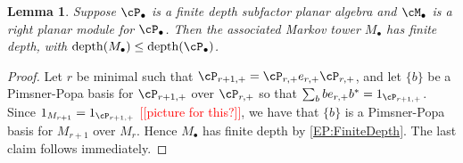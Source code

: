 \documentclass[11pt]{article}
\theoremstyle{plain}
\newtheorem{lem}[thm]{Lemma}
\theoremstyle{definition}
\newcommand{\nn}[1]{\textcolor{red}{[[#1]]}}
\newcommand{\roundNbox}[6]{
	\draw[rounded corners=5pt, very thick, #1] ($#2+(-#3,-#3)+(-#4,0)$) rectangle ($#2+(#3,#3)+(#5,0)$);
	\coordinate (ZZa) at ($#2+(-#4,0)$);
	\coordinate (ZZb) at ($#2+(#5,0)$);
	\node at ($1/2*(ZZa)+1/2*(ZZb)$) {#6};
}
\begin{document}
\begin{lem}
Suppose $\cP_\bullet$ is a finite depth subfactor planar algebra and $\cM_\bullet$ is a right planar module for $\cP_\bullet$.
Then the associated Markov tower $M_\bullet$ has finite depth, with $\operatorname{depth}(M_\bullet) \leq \operatorname{depth}(\cP_\bullet)$.
\end{lem}
\begin{proof}
Let $r$ be minimal such that $\cP_{r+1,+} = \cP_{r,+} e_{r,+}\cP_{r,+}$, and let $\{b\}$ be a Pimsner-Popa basis for $\cP_{r+1,+}$ over $\cP_{r,+}$ so that $\sum_b b e_{r,+} b^* = 1_{\cP_{r+1,+}}$.
Since $1_{M_{r+1}} = 1_{\cP_{r+1,+}}$ \nn{picture for this?}, we have that
$\{b\}$ is a Pimsner-Popa basis for $M_{r+1}$ over $M_r$.
Hence $M_\bullet$ has finite depth by \ref{EP:FiniteDepth}.
The last claim follows immediately.
\end{proof}
\end{document}
